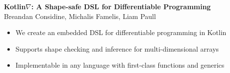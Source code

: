 \documentclass[portrait,a0b,final,a4resizeable]{a0poster}
\def\jointspacing{\vspace{0.3in}}
\begin{document}
  \begin{poster}
    \vspace{1\baselineskip}   %


    \begin{center}
      \begin{pcolumn}{1.03}
        \begin{minipage}[c][9cm][c]{0.85\textwidth}
          \begin{center}
          {\veryHuge \textbf{Kotlin$\nabla$: A Shape-safe DSL for Differentiable Programming}}\\[10mm]
          {\huge Breandan Considine, Michalis Famelis, Liam Paull\\[7.5mm]
          }
          \end{center}
        \end{minipage}
      \end{pcolumn}
    \end{center}

    \vspace*{1.5cm}

    \large



    \Large

    \begin{multicols}{2}



      \vspace*{-1cm}
      \null\hspace*{3cm}\begin{minipage}[c]{0.85\columnwidth}
      \begin{itemize}
        \item We create an embedded DSL for differentiable programming in Kotlin
        \item Supports shape checking and inference for multi-dimensional arrays
        \item Implementable in any language with first-class functions and generics
      \end{itemize}
      \end{minipage}

      \jointspacing

      \vspace*{-1cm}
      \null\hspace*{3cm}\begin{minipage}[c]{0.85\columnwidth}


\end{minipage}
\end{multicols}
\end{poster}
\end{document}
